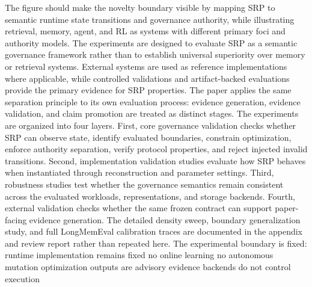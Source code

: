 {}\markdownRendererInterblockSeparator
{}The figure should make the novelty boundary visible by mapping SRP to semantic runtime state transitions and governance authority, while illustrating retrieval, memory, agent, and RL as systems with different primary foci and authority models.\markdownRendererInterblockSeparator
{}
\markdownRendererSectionEnd 
\markdownRendererSectionEnd \markdownRendererSectionBegin
{}\markdownRendererInterblockSeparator
{}The experiments are designed to evaluate SRP as a semantic governance framework rather than to establish universal superiority over memory or retrieval systems. External systems are used as reference implementations where applicable, while controlled validations and artifact-backed evaluations provide the primary evidence for SRP properties.\markdownRendererParagraphSeparator
{}The paper applies the same separation principle to its own evaluation process: evidence generation, evidence validation, and claim promotion are treated as distinct stages.\markdownRendererParagraphSeparator
{}The experiments are organized into four layers. First, core governance validation checks whether SRP can observe state, identify evaluated boundaries, constrain optimization, enforce authority separation, verify protocol properties, and reject injected invalid transitions. Second, implementation validation studies evaluate how SRP behaves when instantiated through reconstruction and parameter settings. Third, robustness studies test whether the governance semantics remain consistent across the evaluated workloads, representations, and storage backends. Fourth, external validation checks whether the same frozen contract can support paper-facing evidence generation.\markdownRendererParagraphSeparator
{}The detailed density sweep, boundary generalization study, and full LongMemEval calibration traces are documented in the appendix and review report rather than repeated here.\markdownRendererParagraphSeparator
{}The experimental boundary is fixed:\markdownRendererInterblockSeparator
{}\markdownRendererUlBeginTight
\markdownRendererUlItem runtime implementation remains fixed\markdownRendererUlItemEnd 
\markdownRendererUlItem no online learning\markdownRendererUlItemEnd 
\markdownRendererUlItem no autonomous mutation\markdownRendererUlItemEnd 
\markdownRendererUlItem optimization outputs are advisory\markdownRendererUlItemEnd 
\markdownRendererUlItem evidence backends do not control execution\markdownRendererUlItemEnd 
